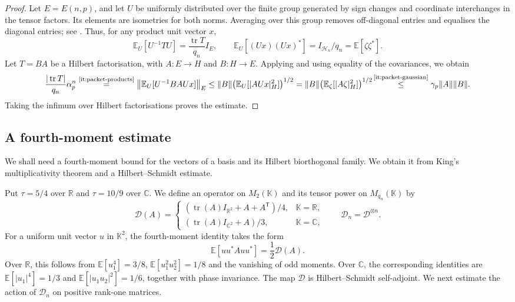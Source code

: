 \documentclass[11pt,a4paper,reqno]{amsart}
\theoremstyle{definition}
\newcommand{\R}{\mathbb R}
\newcommand{\C}{\mathbb C}
\newcommand{\norm}[1]{\lVert #1\rVert}
\DeclareMathOperator{\tr}{tr}
\numberwithin{equation}{section}
\begin{document}
\begin{proof}
Let $E=E(n,p)$, and let $U$ be uniformly distributed over the finite group generated by sign changes and coordinate interchanges in the tensor factors. Its elements are isometries for both norms. Averaging over this group removes off-diagonal entries and equalises the diagonal entries; see \cite[Section~2.5]{AubrunMullerHermes2026}. Thus, for any product unit vector $x$,
\begin{equation*}
 \mathbb E_U[U^{-1}TU]=\frac{\tr T}{q_n}I_E,
 \qquad
 \mathbb E_U[(Ux)(Ux)^*]=I_{\mathcal H_n}/q_n=\mathbb E[\zeta\zeta^*].
\end{equation*}
Let $T=BA$ be a Hilbert factorisation, with $A\colon E\to H$ and $B\colon H\to E$. Applying  and using equality of the covariances, we obtain
\begin{equation*}
 \frac{|\tr T|}{q_n}\alpha_p^n
 \overset{\text{\ref{it:packet-products}}}{=}\left\|\mathbb E_U[U^{-1}BAUx]\right\|_E
 \leq\norm B\bigl(\mathbb E_U[|AUx|_H^2]\bigr)^{1/2}
 =\norm B\bigl(\mathbb E_\zeta[|A\zeta|_H^2]\bigr)^{1/2}
 \!\overset{\text{\ref{it:packet-gaussian}}}{\leq}\gamma_p\norm A\norm B.
\end{equation*}
Taking the infimum over Hilbert factorisations proves the estimate.
\end{proof}
\subsection{A fourth-moment estimate}\label{sec:fourth-moments}

We shall need a fourth-moment bound for the vectors of a basis and its Hilbert biorthogonal family. We obtain it from King's multiplicativity theorem \cite{King2003} and a Hilbert--Schmidt estimate.

Put $\tau=5/4$ over $\R$ and $\tau=10/9$ over $\C$. We define an operator on $M_2(\mathbb K)$ and its tensor power on $M_{q_n}(\mathbb K)$ by
\begin{equation*}
 \mathcal D(A)=
 \begin{cases}
  (\tr(A)I_{\R^2}+A+A^{\mathsf T})/4,&\mathbb K=\R,\\
  (\tr(A)I_{\C^2}+A)/3,&\mathbb K=\C,
 \end{cases}
 \qquad \mathcal D_n=\mathcal D^{\otimes n}.
\end{equation*}
For a uniform unit vector $u$ in $\mathbb K^2$, the fourth-moment identity takes the form
\begin{equation}\label{eq:circle-moment}
 \mathbb E[uu^*Auu^*]=\frac12\mathcal D(A).
\end{equation}
Over $\R$, this follows from $\mathbb E[u_1^4]=3/8$, $\mathbb E[u_1^2u_2^2]=1/8$ and the vanishing of odd moments. Over $\C$, the corresponding identities are $\mathbb E[|u_1|^4]=1/3$ and $\mathbb E[|u_1u_2|^2]=1/6$, together with phase invariance. The map $\mathcal D$ is Hilbert--Schmidt self-adjoint. We next estimate the action of $\mathcal D_n$ on positive rank-one matrices.
\end{document}
